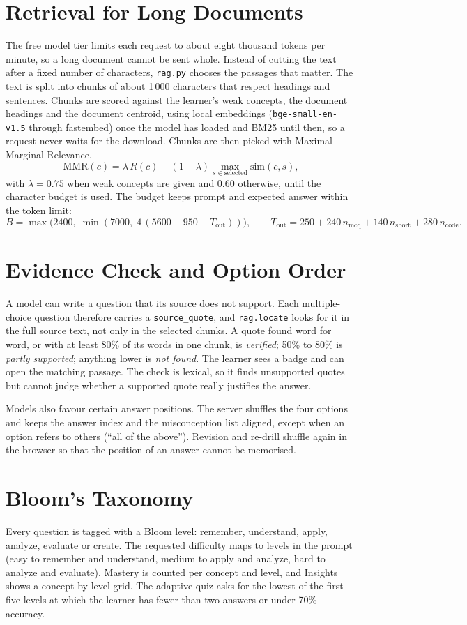 \section{Retrieval for Long Documents}
The free model tier limits each request to about eight thousand tokens per minute, so a long document cannot be sent whole. Instead of cutting the text after a fixed number of characters, \texttt{rag.py} chooses the passages that matter. The text is split into chunks of about 1\,000 characters that respect headings and sentences. Chunks are scored against the learner's weak concepts, the document headings and the document centroid, using local embeddings (\texttt{bge-small-en-v1.5} through fastembed) once the model has loaded and BM25 until then, so a request never waits for the download. Chunks are then picked with Maximal Marginal Relevance,
\[
\mathrm{MMR}(c)=\lambda\,R(c)-(1-\lambda)\max_{s\in\text{selected}}\mathrm{sim}(c,s),
\]
with $\lambda=0.75$ when weak concepts are given and $0.60$ otherwise, until the character budget is used. The budget keeps prompt and expected answer within the token limit:
\[
B=\max\bigl(2400,\;\min(7000,\;4\,(5600-950-T_{\mathrm{out}}))\bigr),\qquad
T_{\mathrm{out}}=250+240\,n_{\mathrm{mcq}}+140\,n_{\mathrm{short}}+280\,n_{\mathrm{code}}.
\]

\section{Evidence Check and Option Order}
A model can write a question that its source does not support. Each multiple-choice question therefore carries a \texttt{source\_quote}, and \texttt{rag.locate} looks for it in the full source text, not only in the selected chunks. A quote found word for word, or with at least 80\% of its words in one chunk, is \emph{verified}; 50\% to 80\% is \emph{partly supported}; anything lower is \emph{not found}. The learner sees a badge and can open the matching passage. The check is lexical, so it finds unsupported quotes but cannot judge whether a supported quote really justifies the answer.

Models also favour certain answer positions. The server shuffles the four options and keeps the answer index and the misconception list aligned, except when an option refers to others (``all of the above''). Revision and re-drill shuffle again in the browser so that the position of an answer cannot be memorised.

\section{Bloom's Taxonomy}
Every question is tagged with a Bloom level: remember, understand, apply, analyze, evaluate or create. The requested difficulty maps to levels in the prompt (easy to remember and understand, medium to apply and analyze, hard to analyze and evaluate). Mastery is counted per concept and level, and Insights shows a concept-by-level grid. The adaptive quiz asks for the lowest of the first five levels at which the learner has fewer than two answers or under 70\% accuracy.

